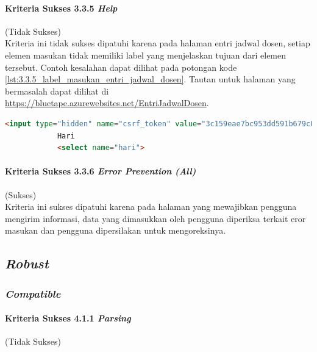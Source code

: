 \documentclass[a4paper,twoside]{article}
\begin{document}
\begin{enumerate}
		\paragraph{Kriteria Sukses 3.3.5 \textit{Help}}
		\label{par:kepatuhan_bluetape_kriteria_sukses_3.3.5}
		(Tidak Sukses)\\

		Kriteria ini tidak sukses dipatuhi karena pada halaman entri jadwal dosen, setiap elemen masukan tidak memiliki label yang menjelaskan tujuan dari elemen tersebut. Contoh kesalahan dapat dilihat pada potongan kode \ref{lst:3.3.5_label_masukan_entri_jadwal_dosen}. Tautan untuk halaman yang bermasalah dapat dilihat di \url{https://bluetape.azurewebsites.net/EntriJadwalDosen}.

		\begin{lstlisting}[frame=single, label={lst:3.3.5_label_masukan_entri_jadwal_dosen}, language=HTML, caption=Kriteria Sukses 3.3.5 - Tidak Terdapat Label pada Kolom Masukan di Halaman Entri Jadwal Dosen]
			<input type="hidden" name="csrf_token" value="3c159eae7bc953dd591b679c080ed066"/>
			Hari
			<select name="hari">
		\end{lstlisting}
		
		\paragraph{Kriteria Sukses 3.3.6 \textit{Error Prevention (All)}}
		\label{par:kepatuhan_bluetape_kriteria_sukses_3.3.6}
		(Sukses)\\

		Kriteria ini sukses dipatuhi karena pada halaman yang mewajibkan pengguna mengirim informasi, data yang dimasukkan oleh pengguna diperiksa terkait eror masukan dan pengguna dipersilakan untuk mengoreksinya.

		\subsection*{\textit{Robust}}
		\label{subsec:kepatuhan_bluetape_robust}

		\subsubsection*{\textit{Compatible}}
		\label{subsubsec:kepatuhan_bluetape_compatible}

		\paragraph{Kriteria Sukses 4.1.1 \textit{Parsing}}
		\label{par:kepatuhan_bluetape_kriteria_sukses_4.1.1}
		(Tidak Sukses)\\


\end{enumerate}
\end{document}
